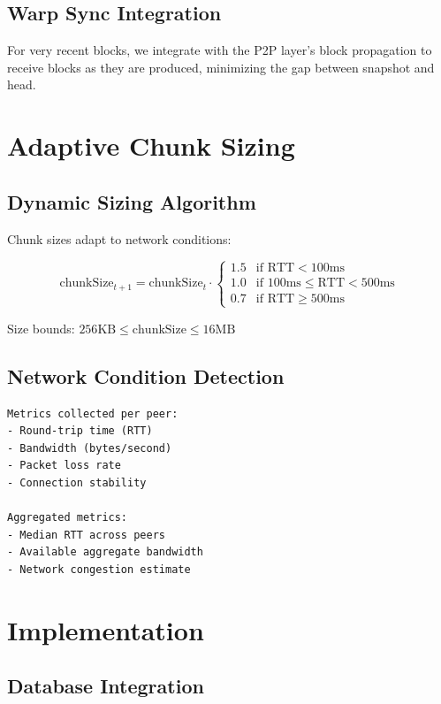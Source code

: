 \documentclass[11pt,a4paper]{article}
\begin{document}
\subsection{Warp Sync Integration}

For very recent blocks, we integrate with the P2P layer's block propagation to receive blocks as they are produced, minimizing the gap between snapshot and head.

\section{Adaptive Chunk Sizing}

\subsection{Dynamic Sizing Algorithm}

Chunk sizes adapt to network conditions:

\[
\text{chunkSize}_{t+1} = \text{chunkSize}_t \cdot \begin{cases}
1.5 & \text{if RTT} < 100\text{ms} \\
1.0 & \text{if } 100\text{ms} \leq \text{RTT} < 500\text{ms} \\
0.7 & \text{if RTT} \geq 500\text{ms}
\end{cases}
\]

Size bounds: $256\text{KB} \leq \text{chunkSize} \leq 16\text{MB}$

\subsection{Network Condition Detection}

\begin{lstlisting}
Metrics collected per peer:
- Round-trip time (RTT)
- Bandwidth (bytes/second)
- Packet loss rate
- Connection stability

Aggregated metrics:
- Median RTT across peers
- Available aggregate bandwidth
- Network congestion estimate
\end{lstlisting}

\section{Implementation}

\subsection{Database Integration}
\end{document}

